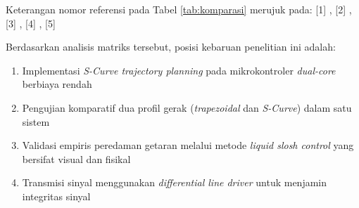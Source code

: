 Keterangan nomor referensi pada Tabel \ref{tab:komparasi} merujuk pada:
[1] \textcite{li2017implementation},
[2] \textcite{liu2023time},
[3] \textcite{liu2026intelligent},
[4] \textcite{schnegas2024trajectory},
[5] \textcite{tatte2026optimized}

Berdasarkan analisis matriks tersebut, posisi kebaruan penelitian ini adalah:
\begin{enumerate}
    \item Implementasi \textit{S-Curve trajectory planning} pada mikrokontroler \textit{dual-core} berbiaya rendah
    \item Pengujian komparatif dua profil gerak (\textit{trapezoidal} dan \textit{S-Curve}) dalam satu sistem
    \item Validasi empiris peredaman getaran melalui metode \textit{liquid slosh control} yang bersifat visual dan fisikal
    \item Transmisi sinyal menggunakan \textit{differential line driver} untuk menjamin integritas sinyal
\end{enumerate}